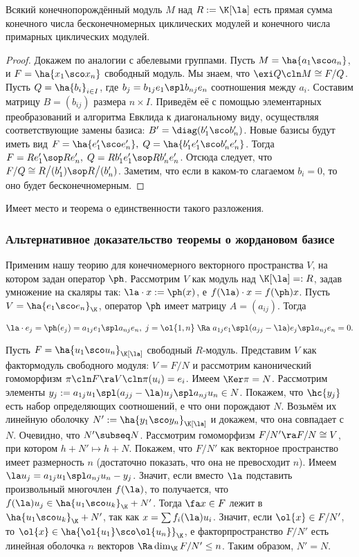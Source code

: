 \documentclass[a4paper]{article}
\begin{document}
\begin{theorem}
Всякий конечнопорождённый модуль $M$ над $R:=\K[\la]$ есть прямая сумма конечного числа  бесконечномерных
циклических модулей и конечного числа примарных циклических модулей.
\end{theorem}
\begin{proof}
Докажем по аналогии с абелевыми группами. Пусть $M=\ha{a_1 \sco a_n}$, и $F=\ha{x_1 \sco x_n}$  свободный
модуль. Мы знаем, что $\exi Q\cln M \cong F/Q$. Пусть $Q=\ha{b_i}_{i \in I}$, где $b_j=b_{1j}e_1  \spl
b_{nj}e_n$ соотношения между $a_i$. Составим матрицу $B=(b_{ij})$ размера $n \times I$. Приведём её с
помощью элементарных преобразований и алгоритма Евклида к диагональному виду, осуществляя соответствующие
замены базиса: $B'=\diag(b'_1 \sco b'_n)$. Новые базисы будут иметь вид $F=\ha{e'_1 \sco e'_n}, \;
Q=\ha{b'_1e'_1 \sco b'_n e'_n}$. Тогда $F=Re'_1 \sop Re'_n, \; Q= R b'_1 e'_1 \sop R b'_n e'_n$. Отсюда
следует, что $F/Q \cong R\bigl/(b'_1) \sop R\bigl/(b'_n)$. Заметим, что если в каком-то слагаемом $b_i=0$, то
оно будет бесконечномерным.
\end{proof}

Имеет место и теорема о единственности такого разложения.

\subsubsection{Альтернативное доказательство теоремы о жордановом базисе}

Применим нашу теорию для конечномерного векторного пространства $V$, на котором задан оператор $\ph$.
Рассмотрим $V$ как модуль над $\K[\la]=:R$, задав умножение на скаляры так: $\la \cdot x :=
\ph(x)$, е $f(\la)\cdot x=f(\ph)x$. Пусть $V=\ha{e_1 \sco e_n}_\K$, оператор $\ph$ имеет матрицу
$A=(a_{ij})$. Тогда

$$\la \cdot e_j = \ph(e_j) = a_{1j}e_1  \spl  a_{nj}e_n, \; j=\ol{1, n} \; \Ra \; a_{1j}e_1  \spl  (a_{jj}-\la)e_j  \spl  a_{nj}e_n=0.$$

Пусть $F=\ha{u_1 \sco u_n}_{\K[\la]}$ свободный $R$-модуль. Представим $V$ как фактормодуль
свободного модуля: $V=F/N$ и рассмотрим канонический гомоморфизм $\pi\cln F \ra V\cln \pi(u_i)=e_i$. Имеем $\Ker
\pi = N$. Рассмотрим элементы $y_j:=a_{1j}u_1  \spl  (a_{jj}-\la)u_j  \spl  a_{nj}u_n \in N$. Покажем,
что $\hc{y_j}$ есть набор определяющих соотношений, е что они порождают $N$. Возьмём их линейную оболочку
$N':=\ha{y_1 \sco y_n}_{\K[\la]}$ и докажем, что она совпадает с $N$. Очевидно, что $N' \subseq N$.
Рассмотрим гомоморфизм $F/N' \ra F/N \cong V$, при котором $h + N' \mapsto h + N$. Покажем, что $F/N'$ как векторное
пространство имеет размерность $n$ (достаточно показать, что она не превосходит $n$). Имеем $\la u_j =
a_{1j}u_1  \spl  a_{nj}u_n - y_j$. Значит, если вместо $\la$ подставить произвольный многочлен
$f(\la)$, то получается, что $f(\la)u_j \in \ha{u_1 \sco u_k}_\K + N'$. Тогда $\fa x \in F$ лежит в
$\ha{u_1 \sco u_k}_\K + N'$, так как $x = \sum f_i(\la) u_i$. Значит, если $\ol{x} \in F/N'$, то $\ol{x}
\in \ha{\ol{u_1} \sco \ol{u_n}}_\K$, е факторпространство $F/N'$ есть линейная оболочка $n$ векторов $\Ra
\dim_\K F/N' \le n$. Таким образом, $N'=N$.
\end{document}
